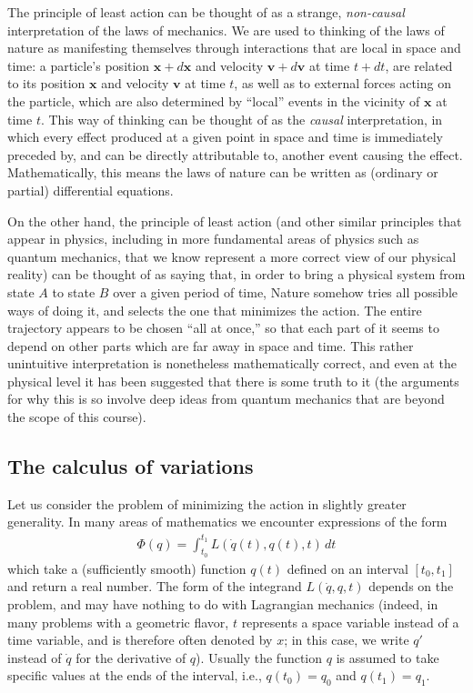 \documentclass[12pt]{amsart}
\newcommand{\eq}[1]{\begin{equation}\begin{split}#1\end{split}\end{equation}}
\begin{document}
The principle of least action can be thought of as a strange, \emph{non-causal} interpretation of the laws of mechanics. We are used to thinking of the laws of nature as manifesting themselves through interactions that are local in space and time: a particle's position $\mathbf{x}+d\mathbf{x}$ and velocity $\mathbf{v}+d\mathbf{v}$ at time $t+dt$, are related to its position $\mathbf{x}$ and velocity $\mathbf{v}$ at time $t$, as well as to external forces acting on the particle, which are also determined by ``local'' events in the vicinity of $\mathbf{x}$ at time $t$. This way of thinking can be thought of as the \emph{causal} interpretation, in which every effect produced at a given point in space and time is immediately preceded by, and can be directly attributable to, another event causing the effect. Mathematically, this means the laws of nature can be written as (ordinary or partial) differential equations. 

On the other hand, the principle of least action (and other similar principles that appear in physics, including in more fundamental areas of physics such as quantum mechanics, that we know represent a more correct view of our physical reality) can be thought of as saying that, in order to bring a physical system from state $A$ to state $B$ over a given period of time, Nature somehow tries all possible ways of doing it, and selects the one that minimizes the action. The entire trajectory appears to be chosen ``all at once,'' so that each part of it seems to depend on other parts which are far away in space and time. This rather unintuitive interpretation is nonetheless mathematically correct, and even at the physical level it has been suggested that there is some truth to it (the arguments for why this is so involve deep ideas from quantum mechanics that are beyond the scope of this course).

\subsection{The calculus of variations \label{sec:variational-calculus}} Let us consider the problem of minimizing the action in slightly greater generality. In many areas of mathematics we encounter expressions of the form
\eq{ \label{eq:functional}
\Phi(q) = \int_{t_0}^{t_1} L(\dot{q}(t),q(t),t)\,dt 
}
which take a (sufficiently smooth) function $q(t)$ defined on an interval $[t_0,t_1]$ and return a real number. The form of the integrand $L(\dot{q},q,t)$ depends on the problem, and may have nothing to do with Lagrangian mechanics (indeed, in many problems with a geometric flavor, $t$ represents a space variable instead of a time variable, and is therefore often denoted by $x$; in this case, we write $q'$ instead of $\dot{q}$ for the derivative of $q$). Usually the function $q$ is assumed to take specific values at the ends of the interval, i.e., $q(t_0)=q_0$ and $q(t_1)=q_1$.
\end{document}
